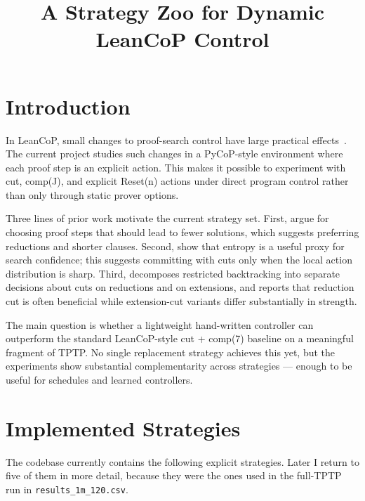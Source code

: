 \documentclass[11pt,twocolumn]{article}
\title{A Strategy Zoo for Dynamic LeanCoP Control}
\date{}
\author{}
\newcommand{\atom}[1]{\colorbox{Gray!30}{\ttfamily #1}}
\newcommand{\citen}[1]{~\parencite{#1}}
\newcommand{\citeay}[1]{\textcite{#1}}
\begin{document}
\twocolumn[
	\centering
	\vspace{1em}
	{\LARGE A Strategy Zoo for Dynamic LeanCoP Control \par} \vspace{3pt}
	{\large Preliminary notes for the strategy paper \par}
	\vspace{2em}
]

\section{Introduction}

In LeanCoP, small changes to proof-search control have large practical effects\citen{ottenLeanCoP20,Otten2023leanCoP20}. The current project studies such changes in a PyCoP-style environment where each proof step is an explicit action. This makes it possible to experiment with \atom{cut}, \atom{comp(J)}, and explicit \atom{Reset(n)} actions under direct program control rather than only through static prover options.

Three lines of prior work motivate the current strategy set. First, \citeay{letzModelEliminationConnection2001} argue for choosing proof steps that should lead to fewer solutions, which suggests preferring reductions and shorter clauses. Second, \citeay{zomboriRoleEntropyGuiding2021} show that entropy is a useful proxy for search confidence; this suggests committing with cuts only when the local action distribution is sharp. Third, \citeay{farberCuriouslyEffectiveBacktracking2024} decomposes restricted backtracking into separate decisions about cuts on reductions and on extensions, and reports that reduction cut is often beneficial while extension-cut variants differ substantially in strength.

The main question is whether a lightweight hand-written controller can outperform the standard LeanCoP-style \atom{cut + comp(7)} baseline on a meaningful fragment of TPTP. No single replacement strategy achieves this yet, but the experiments show substantial complementarity across strategies --- enough to be useful for schedules and learned controllers.

\section{Implemented Strategies}

The codebase currently contains the following explicit strategies. Later I return to five of them in more detail, because they were the ones used in the full-TPTP run in \texttt{results\_1m\_120.csv}.
\end{document}
